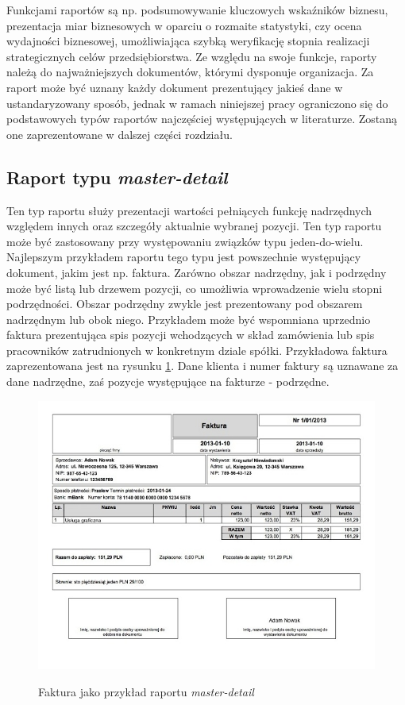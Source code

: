 \documentclass[11pt,a4paper]{article}
\begin{document}
Funkcjami raportów są np. podsumowywanie kluczowych wskaźników biznesu, prezentacja miar biznesowych w oparciu o rozmaite statystyki, czy ocena wydajności biznesowej, umożliwiająca szybką weryfikację stopnia realizacji strategicznych celów przedsiębiorstwa. Ze względu na swoje funkcje, raporty należą do najważniejszych dokumentów, którymi dysponuje organizacja. 
Za raport może być uznany każdy dokument prezentujący jakieś dane w ustandaryzowany sposób, jednak w ramach niniejszej pracy ograniczono się do podstawowych typów raportów najczęściej występujących w literaturze. Zostaną one zaprezentowane w dalszej części rozdziału.

\subsection{Raport typu \emph{master-detail}} \label{teoria:md}
Ten typ raportu służy prezentacji wartości pełniących funkcję nadrzędnych względem innych oraz szczegóły aktualnie wybranej pozycji. Ten typ raportu może być zastosowany przy występowaniu związków typu jeden-do-wielu. Najlepszym przykładem raportu tego typu jest powszechnie występujący dokument, jakim jest np. faktura. Zarówno obszar nadrzędny, jak i podrzędny może być listą lub drzewem pozycji, co umożliwia wprowadzenie wielu stopni podrzędności. Obszar podrzędny zwykle jest prezentowany pod obszarem nadrzędnym lub obok niego. Przykładem może być wspomniana uprzednio faktura prezentująca spis pozycji wchodzących w skład zamówienia lub spis pracowników zatrudnionych w konkretnym dziale spółki. Przykładowa faktura zaprezentowana jest na rysunku \ref{img:faktura}. Dane klienta i numer faktury są uznawane za dane nadrzędne, zaś pozycje występujące na fakturze - podrzędne. 

\begin{figure}[h]
\centering
\caption{Faktura jako przykład raportu \emph{master-detail}}
\includegraphics[scale=0.80]{faktura_vat_pdf}
\label{img:faktura}
\end{figure}
\end{document}
